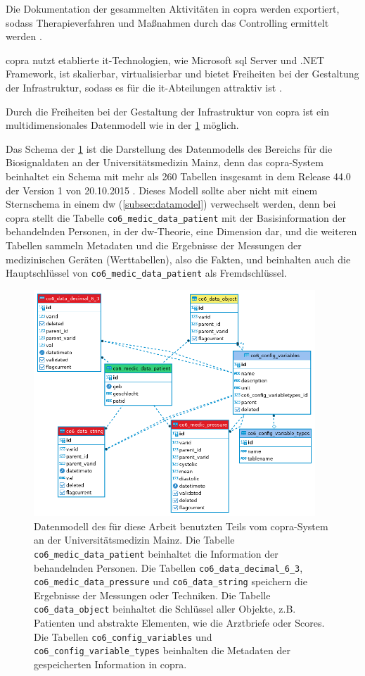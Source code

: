 Die Dokumentation der gesammelten Aktivitäten in \ac{copra} werden exportiert, sodass Therapieverfahren und Maßnahmen durch das Controlling ermittelt werden \cite{copra}.

\ac{copra} nutzt etablierte \ac{it}-Technologien, wie Microsoft \acs{sql} Server und .NET Framework, ist skalierbar, virtualisierbar und bietet Freiheiten bei der Gestaltung der Infrastruktur, sodass es für die \ac{it}-Abteilungen attraktiv ist \cite{copra}.

Durch die Freiheiten bei der Gestaltung der Infrastruktur von \ac{copra} ist ein multidimensionales Datenmodell wie in der \ref{fig:copraschema} möglich. 

Das Schema der \ref{fig:copraschema} ist die Darstellung des Datenmodells des Bereichs für die Biosignaldaten an der Universitätsmedizin Mainz, denn das \ac{copra}-System beinhaltet ein Schema mit mehr als 260 Tabellen insgesamt in dem Release 44.0 der Version 1 von 20.10.2015 \cite{copradoc}. Dieses Modell sollte aber nicht mit einem Sternschema in einem \ac{dw} (\ref{subsec:datamodel}) verwechselt werden, denn bei \ac{copra} stellt die Tabelle \texttt{co6\_medic\_data\_patient} mit der Basisinformation der behandelnden Personen, in der \ac{dw}-Theorie, eine Dimension dar, und die weiteren Tabellen sammeln Metadaten und die Ergebnisse der Messungen der medizinischen Geräten (Werttabellen), also die Fakten, und beinhalten auch die Hauptschlüssel von \texttt{co6\_medic\_data\_patient} als Fremdschlüssel.

\clearpage

\begin{figure}[ht]
	\centering
	\includegraphics[height=8.5cm]{figures/copra_data_model_data}
	\caption[Datenmodell von \acs{copra}]{Datenmodell des für diese Arbeit benutzten Teils vom \ac{copra}-System an der Universitätsmedizin Mainz. Die Tabelle \texttt{co6\_medic\_data\_patient} beinhaltet die Information der behandelnden Personen. Die Tabellen \texttt{co6\_data\_decimal\_6\_3}, \texttt{co6\_medic\_data\_pressure} und \texttt{co6\_data\_string} speichern die Ergebnisse der Messungen oder Techniken. Die Tabelle \texttt{co6\_data\_object} beinhaltet die Schlüssel aller Objekte, z.B. Patienten und abstrakte Elementen, wie die Arztbriefe oder Scores.
	Die Tabellen \texttt{co6\_config\_variables} und \texttt{co6\_config\_variable\_types} beinhalten die Metadaten der gespeicherten Information in \ac{copra}.}
	\label{fig:copraschema}
\end{figure}



